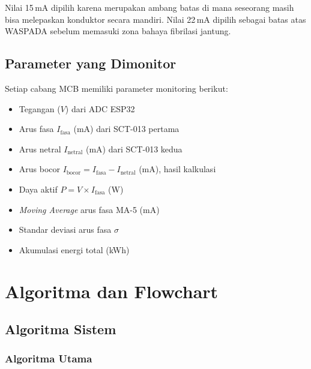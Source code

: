 \documentclass[12pt,a4paper]{article}
\begin{document}
Nilai 15\,mA dipilih karena merupakan ambang batas di mana seseorang masih bisa
melepaskan konduktor secara mandiri. Nilai 22\,mA dipilih sebagai batas atas
WASPADA sebelum memasuki zona bahaya fibrilasi jantung.

\subsection{Parameter yang Dimonitor}

Setiap cabang MCB memiliki parameter monitoring berikut:

\begin{itemize}
    \item Tegangan ($V$) dari ADC ESP32
    \item Arus fasa $I_{\text{fasa}}$ (mA) dari SCT-013 pertama
    \item Arus netral $I_{\text{netral}}$ (mA) dari SCT-013 kedua
    \item Arus bocor $I_{\text{bocor}} = I_{\text{fasa}} - I_{\text{netral}}$ (mA), hasil kalkulasi
    \item Daya aktif $P = V \times I_{\text{fasa}}$ (W)
    \item \emph{Moving Average} arus fasa MA-5 (mA)
    \item Standar deviasi arus fasa $\sigma$
    \item Akumulasi energi total (kWh)
\end{itemize}

\section{Algoritma dan Flowchart}

\subsection{Algoritma Sistem}

\subsubsection*{Algoritma Utama}
\end{document}
